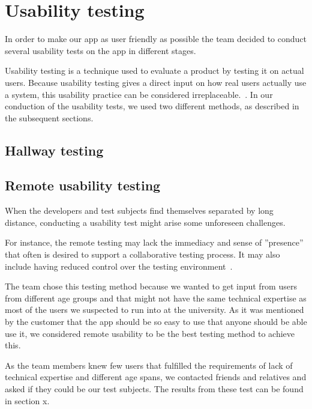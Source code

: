 \section{Usability testing}
\label{sec:userTest}
In order to make our app as user friendly as possible the team decided to conduct several usability tests on the app in different stages.

Usability testing is a technique used to evaluate a product by testing it on actual users. Because usability testing gives a direct input on how real users actually use a system, this usability practice can be considered irreplaceable.~\cite{usability}. In our conduction of the usability tests, we used two different methods, as described in the subsequent sections.



\subsection{Hallway testing}

\subsection{Remote usability testing}
When the developers and test subjects find themselves separated by long distance, conducting a usability test might arise some unforeseen challenges.

For instance, the remote testing may lack the immediacy and sense of ''presence'' that often is desired to support a collaborative testing process. It may also include having reduced control over the testing environment~\cite{remoteTest}. 

The team chose this testing method because we wanted to get input from users from different age groups and that might not have the same technical expertise as most of the users we suspected to run into at the university. As it was mentioned by the customer that the app should be so easy to use that anyone should be able use it, we considered remote usability to be the best testing method to achieve this.

As the team members knew few users that fulfilled the requirements of lack of technical expertise and different age spans, we contacted friends and relatives and asked if they could be our test subjects. The results from these test can be found in section x.

